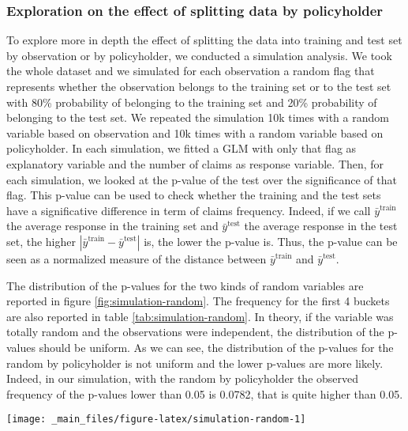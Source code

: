 \documentclass[a4paper, twoside, openright, 12pt]{report}
\let\origfigure\figure
\let\endorigfigure\endfigure
\renewenvironment{figure}[1][2] {
  \expandafter\origfigure\expandafter[!hbtp]
} {
  \endorigfigure
}
\theoremstyle{definition}
\theoremstyle{definition}
\theoremstyle{definition}
\theoremstyle{remark}
\begin{document}
\hypertarget{chap:exploration-splitting-policyholder}{%
\subsubsection{Exploration on the effect of splitting data by policyholder}\label{chap:exploration-splitting-policyholder}}

To explore more in depth the effect of splitting the data into training and test set by observation or by policyholder, we conducted a simulation analysis. We took the whole dataset and we simulated for each observation a random flag that represents whether the observation belongs to the training set or to the test set with 80\% probability of belonging to the training set and 20\% probability of belonging to the test set. We repeated the simulation 10k times with a random variable based on observation and 10k times with a random variable based on policyholder. In each simulation, we fitted a GLM with only that flag as explanatory variable and the number of claims as response variable. Then, for each simulation, we looked at the p-value of the test over the significance of that flag. This p-value can be used to check whether the training and the test sets have a significative difference in term of claims frequency. Indeed, if we call \(\bar{y}^\text{train}\) the average response in the training set and \(\bar{y}^\text{test}\) the average response in the test set, the higher \(\left|\bar{y}^\text{train} - \bar{y}^\text{test}\right|\) is, the lower the p-value is. Thus, the p-value can be seen as a normalized measure of the distance between \(\bar{y}^\text{train}\) and \(\bar{y}^\text{test}\).

The distribution of the p-values for the two kinds of random variables are reported in figure \ref{fig:simulation-random}. The frequency for the first 4 buckets are also reported in table \ref{tab:simulation-random}. In theory, if the variable was totally random and the observations were independent, the distribution of the p-values should be uniform. As we can see, the distribution of the p-values for the random by policyholder is not uniform and the lower p-values are more likely. Indeed, in our simulation, with the random by policyholder the observed frequency of the p-values lower than 0.05 is 0.0782, that is quite higher than 0.05.





\begin{figure}[!hbtp]

{\centering \texttt{[image: \_main\_files/figure-latex/simulation-random-1]} 

}

\caption[Distribution of the p-values from the simulation of the random variables.]{Distribution of the p-values from the simulation of the random variables. With the random by policyholder, the lower p-values are more likely.}\label{fig:simulation-random}
\end{figure}
\end{document}
